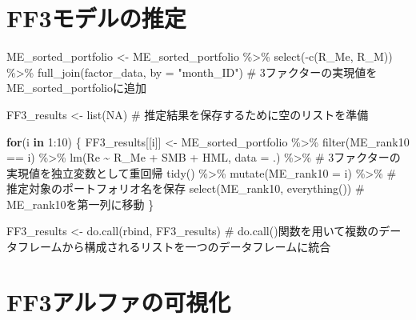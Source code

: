\documentclass[
  letterpaper,
  DIV=11,
  numbers=noendperiod]{scrreprt}
\newenvironment{Shaded}{\begin{snugshade}}{\end{snugshade}}
\newcommand{\AttributeTok}[1]{\textcolor[rgb]{0.40,0.45,0.13}{#1}}
\newcommand{\CommentTok}[1]{\textcolor[rgb]{0.37,0.37,0.37}{#1}}
\newcommand{\ConstantTok}[1]{\textcolor[rgb]{0.56,0.35,0.01}{#1}}
\newcommand{\ControlFlowTok}[1]{\textcolor[rgb]{0.00,0.23,0.31}{\textbf{#1}}}
\newcommand{\DecValTok}[1]{\textcolor[rgb]{0.68,0.00,0.00}{#1}}
\newcommand{\FunctionTok}[1]{\textcolor[rgb]{0.28,0.35,0.67}{#1}}
\newcommand{\NormalTok}[1]{\textcolor[rgb]{0.00,0.23,0.31}{#1}}
\newcommand{\OtherTok}[1]{\textcolor[rgb]{0.00,0.23,0.31}{#1}}
\newcommand{\SpecialCharTok}[1]{\textcolor[rgb]{0.37,0.37,0.37}{#1}}
\newcommand{\StringTok}[1]{\textcolor[rgb]{0.13,0.47,0.30}{#1}}
\begin{document}
\section{FF3モデルの推定}\label{ff3ux30e2ux30c7ux30ebux306eux63a8ux5b9a}

\begin{Shaded}
\begin{Highlighting}[]
\NormalTok{ME\_sorted\_portfolio }\OtherTok{\textless{}{-}}\NormalTok{ ME\_sorted\_portfolio }\SpecialCharTok{\%\textgreater{}\%}
  \FunctionTok{select}\NormalTok{(}\SpecialCharTok{{-}}\FunctionTok{c}\NormalTok{(R\_Me, R\_M)) }\SpecialCharTok{\%\textgreater{}\%}
  \FunctionTok{full\_join}\NormalTok{(factor\_data, }\AttributeTok{by =} \StringTok{"month\_ID"}\NormalTok{) }\CommentTok{\# 3ファクターの実現値をME\_sorted\_portfolioに追加}

\NormalTok{FF3\_results }\OtherTok{\textless{}{-}} \FunctionTok{list}\NormalTok{(}\ConstantTok{NA}\NormalTok{)  }\CommentTok{\# 推定結果を保存するために空のリストを準備}

\ControlFlowTok{for}\NormalTok{(i }\ControlFlowTok{in} \DecValTok{1}\SpecialCharTok{:}\DecValTok{10}\NormalTok{) \{}
\NormalTok{  FF3\_results[[i]] }\OtherTok{\textless{}{-}}\NormalTok{ ME\_sorted\_portfolio }\SpecialCharTok{\%\textgreater{}\%} 
    \FunctionTok{filter}\NormalTok{(ME\_rank10 }\SpecialCharTok{==}\NormalTok{ i) }\SpecialCharTok{\%\textgreater{}\%}
    \FunctionTok{lm}\NormalTok{(Re }\SpecialCharTok{\textasciitilde{}}\NormalTok{ R\_Me }\SpecialCharTok{+}\NormalTok{ SMB }\SpecialCharTok{+}\NormalTok{ HML, }\AttributeTok{data =}\NormalTok{ .) }\SpecialCharTok{\%\textgreater{}\%} \CommentTok{\# 3ファクターの実現値を独立変数として重回帰}
    \FunctionTok{tidy}\NormalTok{() }\SpecialCharTok{\%\textgreater{}\%} 
    \FunctionTok{mutate}\NormalTok{(}\AttributeTok{ME\_rank10 =}\NormalTok{ i) }\SpecialCharTok{\%\textgreater{}\%} \CommentTok{\# 推定対象のポートフォリオ名を保存}
    \FunctionTok{select}\NormalTok{(ME\_rank10, }\FunctionTok{everything}\NormalTok{()) }\CommentTok{\# ME\_rank10を第一列に移動}
\NormalTok{\}}

\NormalTok{FF3\_results }\OtherTok{\textless{}{-}} \FunctionTok{do.call}\NormalTok{(rbind, FF3\_results) }\CommentTok{\# do.call()関数を用いて複数のデータフレームから構成されるリストを一つのデータフレームに統合}
\end{Highlighting}
\end{Shaded}

\section{FF3アルファの可視化}\label{ff3ux30a2ux30ebux30d5ux30a1ux306eux53efux8996ux5316}
\end{document}

